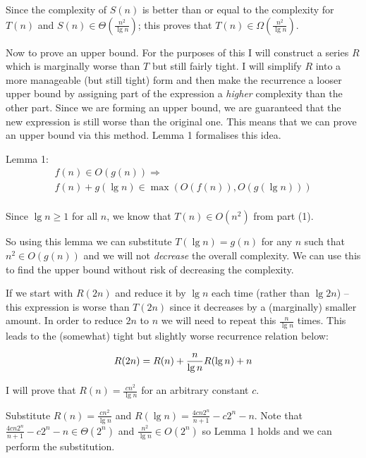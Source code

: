 \documentclass[10pt,\jkfside,a4paper]{article}
\begin{document}
\begin{enumerate}
Since the complexity of $S(n)$ is better than or equal to the complexity for 
$T(n)$ and $S(n) \in \Theta \left( \frac{n^2}{\lg n} \right)$; this proves that 
$T(n) \in \Omega(\frac{n^2}{\lg n})$.

Now to prove an upper bound. For the purposes of this I will construct a series $R$ which is 
marginally worse than $T$ but still fairly tight. I will simplify $R$ into a more manageable 
(but still tight) form and then make the recurrence a looser upper bound by assigning part of 
the expression a \textit{higher} complexity than the other part. Since we are forming an upper bound, 
we are guaranteed that the new expression is still worse than the original one. This means that we can 
prove an upper bound via this method. Lemma 1 formalises this idea.

Lemma 1:
\begin{equation}
\begin{split}
f(n) \in O(g(n)) \Longrightarrow \\
f(n) + g(\lg n) \in \max(O(f(n)), O(g(\lg n))) \\
\end{split}
\end{equation}

Since $\lg n \geq 1$ for all $n$, we know that $T(n) \in O(n^2)$ from part (1).

So using this lemma we can substitute $T(\lg n) = g(n)$ for any $n$ such that $n^2 \in O(g(n))$ 
and we will not \textit{decrease} the overall complexity. We can use this to find the upper 
bound without risk of decreasing the complexity.

If we start with $R(2n)$ and reduce it by $\lg n$ each time (rather than $\lg 2n$) -- this expression 
is worse than $T(2n)$ since it decreases by a (marginally) smaller amount. 
In order to reduce $2n$ to $n$ we will need to repeat this $\frac{n}{\lg n}$ times. This leads 
to the (somewhat) tight but slightly worse recurrence relation below:

\begin{equation}
R(2n) = R(n) + \frac{n}{\lg n}R(\lg n) + n \\
\end{equation}

I will prove that $R(n) = \frac{c n^2}{\lg n}$ for an arbitrary constant $c$.

Substitute $R(n) = \frac{cn^2}{\lg n}$ and $R(\lg n) = \frac{4cn2^n}{n + 1} - c2^n - n$. 
Note that $\frac{4cn2^n}{n + 1} - c2^n - n \in \Theta(2^n)$ and $\frac{n^2}{\lg n} \in O(2^n)$ 
so Lemma 1 holds and we can perform the substitution.


\end{enumerate}
\end{document}
